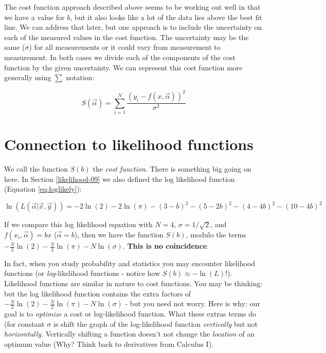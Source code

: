 \documentclass[
]{book}
\theoremstyle{definition}
\theoremstyle{definition}
\theoremstyle{definition}
\theoremstyle{remark}
\begin{document}
The cost function approach described above seems to be working out well in that we have a value for \(b\), but it also looks like a lot of the data lies above the best fit line. We can address that later, but one approach is to include the uncertainty on each of the measured values in the cost function. The uncertainty may be the same (\(\sigma\)) for all measurements or it could vary from measurement to measurement. In both cases we divide each of the components of the cost function by the given uncertainty. We can represent this cost function more generally using \(\sum\) notation:

\begin{equation}
S(\vec{\alpha}) = \sum_{i=1}^{N} \frac{(y_{i}-f(x,\vec{\alpha}))^{2}}{\sigma^{2}}
\end{equation}

\hypertarget{connection-to-likelihood-functions}{%
\section{Connection to likelihood functions}\label{connection-to-likelihood-functions}}

We call the function \(S(b)\) the \emph{cost function}. There is something big going on here. In Section \ref{likelihood-09} we also defined the log likelihood function (Equation \eqref{eq:loglikely}):

\begin{equation}
\ln(L(\vec{\alpha} | \vec{x},\vec{y} )) = -2 \ln(2) - 2 \ln (\pi) -(3-b)^{2}-(5-2b)^{2}-(4-4b)^{2}-(10-4b)^{2}
\end{equation}

If we compare this log likelihood equation with \(N=4\), \(\sigma = 1/\sqrt{2}\), and \(f(x_{i},\vec{\alpha} ) =bx\) (\(\vec{\alpha}=b\)), then we have the function \(S(b)\), modulo the terms \(\displaystyle - \frac{N}{2} \ln (2) - \frac{N}{2} \ln(\pi) - N \ln( \sigma)\). \textbf{This is no coincidence}.

In fact, when you study probability and statistics you may encounter likelihood functions (or \emph{log}-likelihood functions - notice how \(S(b) \approx - \ln(L)\)!). Likelihood functions are similar in nature to cost functions. You may be thinking: but the log likelihood function contains the extra factors of \(\displaystyle - \frac{N}{2} \ln (2) - \frac{N}{2} \ln(\pi) - N \ln( \sigma)\) - but you need not worry. Here is why: our goal is to \emph{optimize} a cost or log-likelihood function. What these extras terms do (for constant \(\sigma\) is shift the graph of the log-likelihood function \emph{vertically} but not \emph{horizontally}. Vertically shifting a function doesn't not change the \emph{location} of an optimum value (Why? Think back to derivatives from Calculus I).
\end{document}
